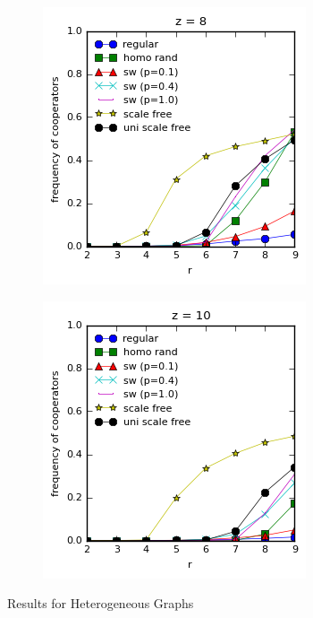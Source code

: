 \documentclass{article}
\begin{document}
\begin{figure}[h]
\begin{subfigure}[b]{0.4\textwidth}
			\caption{}
		\end{subfigure}
		\begin{subfigure}[b]{0.4\textwidth}
			\includegraphics[width=\textwidth]{fig/fixed/z8all.png}
			\caption{}
		\end{subfigure}
		\begin{subfigure}[b]{0.4\textwidth}
			\includegraphics[width=\textwidth]{fig/fixed/z10all.png}
			\caption{}
		\end{subfigure}
		\caption{Results for Heterogeneous Graphs}
		\label{fig:compfixed}
	\end{figure}
\end{document}
